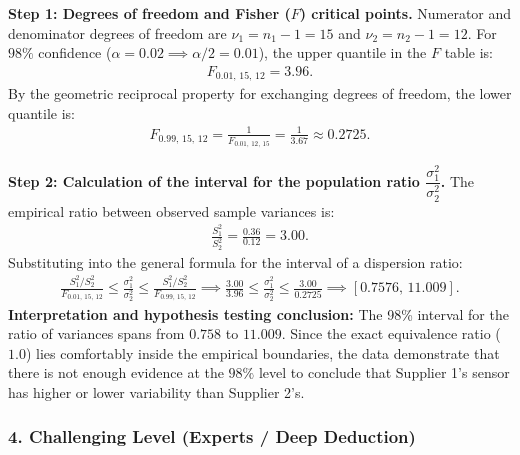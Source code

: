 \begin{solucion}
	\textbf{Step 1: Degrees of freedom and Fisher ($F$) critical points.}
	Numerator and denominator degrees of freedom are $\nu_1 = n_1 - 1 = 15$ and $\nu_2 = n_2 - 1 = 12$.
	For $98\%$ confidence ($\alpha = 0.02 \implies \alpha/2 = 0.01$), the upper quantile in the $F$ table is:
	\begin{align}
		F_{0.01, \, 15, \, 12} = 3.96.
	\end{align}
	By the geometric reciprocal property for exchanging degrees of freedom, the lower quantile is:
	\begin{align}
		F_{0.99, \, 15, \, 12} = \frac{1}{F_{0.01, \, 12, \, 15}} = \frac{1}{3.67} \approx 0.2725.
	\end{align}
	
	\textbf{Step 2: Calculation of the interval for the population ratio $\dfrac{\sigma_1^2}{\sigma_2^2}$.}
	The empirical ratio between observed sample variances is:
	\begin{align}
		\frac{S_1^2}{S_2^2} = \frac{0.36}{0.12} = 3.00.
	\end{align}
	Substituting into the general formula for the interval of a dispersion ratio:
	\begin{align}
		\frac{S_1^2 / S_2^2}{F_{0.01, \, 15, \, 12}} \le \frac{\sigma_1^2}{\sigma_2^2} \le \frac{S_1^2 / S_2^2}{F_{0.99, \, 15, \, 12}} \implies \frac{3.00}{3.96} \le \frac{\sigma_1^2}{\sigma_2^2} \le \frac{3.00}{0.2725} \implies [0.7576, \, 11.009].
	\end{align}
	\textbf{Interpretation and hypothesis testing conclusion:} The 98\% interval for the ratio of variances spans from $0.758$ to $11.009$. Since the exact equivalence ratio ($1.0$) lies comfortably inside the empirical boundaries, the data demonstrate that there is not enough evidence at the $98\%$ level to conclude that Supplier 1's sensor has higher or lower variability than Supplier 2's.
\end{solucion}

\subsubsection*{4. Challenging Level (Experts / Deep Deduction)}

